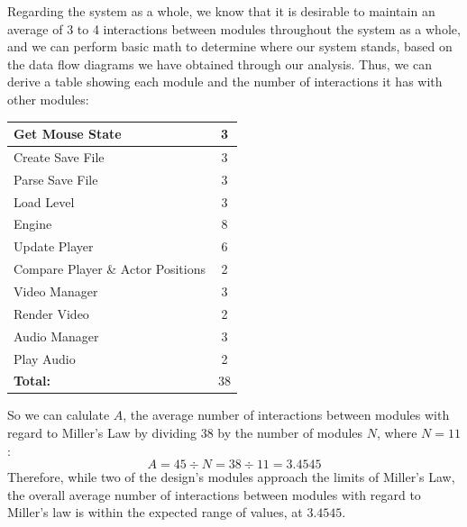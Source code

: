 \documentclass{article}
\begin{document}
			Regarding the system as a whole, we know that it is desirable to maintain an average of 3 to 4 interactions between modules throughout the system as a whole, and we can perform basic math to determine where our system stands, based on the data flow diagrams we have obtained through our analysis. Thus, we can derive a table showing each module and the number of interactions it has with other modules:
			\begin{center}
				\begin{tabular}{| l || c |}
					\hline
					Get Mouse State 					& 3 \\ \hline
					Create Save File					& 3 \\ \hline
					Parse Save File 					& 3 \\ \hline
					Load Level							& 3 \\ \hline
					Engine								& 8 \\ \hline
					Update Player						& 6 \\ \hline
					Compare Player \& Actor Positions	& 2 \\ \hline
					Video Manager						& 3 \\ \hline
					Render Video						& 2 \\ \hline
					Audio Manager						& 3 \\ \hline
					Play Audio							& 2 \\ \hline
					\textbf{Total:}						& 38 \\
					\hline
				\end{tabular}
			\end{center}
			So we can calulate $A$, the average number of interactions between modules with regard to Miller's Law by dividing 38 by the number of modules $N$, where $N = 11$: 
			$$A = 45 \div N = 38 \div 11 = 3.4545$$
			Therefore, while two of the design's modules approach the limits of Miller's Law, the overall average number of interactions between modules with regard to Miller's law is within the expected range of values, at $3.4545$. 
\end{document}
